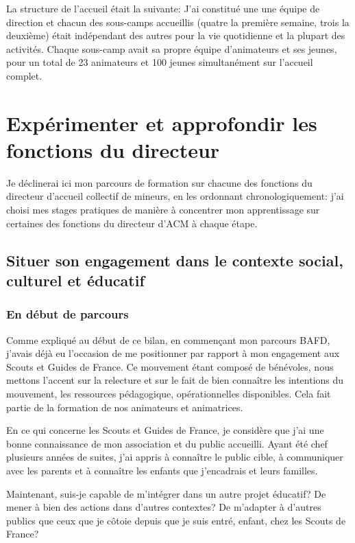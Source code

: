 \documentclass[titlepage,11pt,a4paper]{article}
\begin{document}
La structure de l'accueil était la suivante: J'ai constitué une une équipe de
direction et chacun des sous-camps accueillis (quatre la première semaine, trois la deuxième)
était indépendant des autres pour la vie quotidienne et la plupart des activités.
Chaque sous-camp avait sa propre équipe d'animateurs et ses jeunes, pour un total de 23
animateurs et 100 jeunes simultanément sur l'accueil complet.

\section{Expérimenter et approfondir les fonctions du directeur}

Je déclinerai ici mon parcours de formation sur chacune des fonctions du directeur
d'accueil collectif de mineurs, en les ordonnant chronologiquement: j'ai choisi mes stages
pratiques de manière à concentrer mon apprentissage sur certaines des fonctions du directeur d’ACM à
chaque étape.

\subsection{Situer son engagement dans le contexte social, culturel et éducatif}
\subsubsection{En début de parcours}

Comme expliqué au début de ce bilan, en commençant mon parcours BAFD, j'avais déjà eu
l'occasion de me positionner par rapport à mon engagement aux Scouts et Guides de France.
Ce mouvement étant composé de bénévoles, nous mettons l'accent sur la relecture et sur le
fait de bien connaître les intentions du mouvement, les ressources pédagogique,
opérationnelles disponibles. Cela fait partie de la formation de nos animateurs et
animatrices.

En ce qui concerne les Scouts et Guides de France, je considère que j'ai une bonne
connaissance de mon association et du public accueilli.
Ayant été chef plusieurs années de suites, j'ai appris à connaître le public cible, à
communiquer avec les parents et à connaître les enfants que j'encadrais et leurs familles.

Maintenant, suis-je capable de m'intégrer dans un autre projet éducatif? De mener à bien
des actions dans d'autres contextes? De m'adapter à d'autres publics que ceux que je
côtoie depuis que je suis entré, enfant, chez les Scouts de France?
\end{document}
